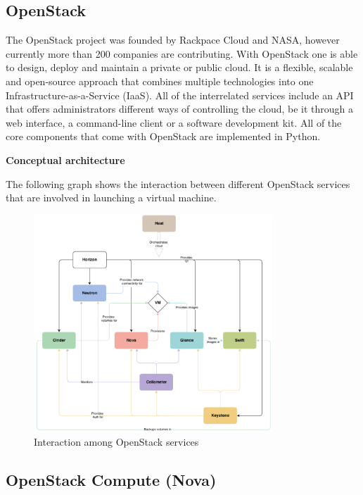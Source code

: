 \subsection{OpenStack}

The OpenStack project was founded by Rackpace Cloud and NASA, however currently more than 200 companies are contributing.
With OpenStack one is able to design, deploy and maintain a private or public cloud. It is a flexible, scalable and open-source approach that combines multiple technologies into one Infrastructure-as-a-Service (IaaS). All of the interrelated services include an API that offers administrators different ways of controlling the cloud, be it through a web interface, a command-line client or a software development kit. All of the core components that come with OpenStack are implemented in Python.


\textbf{Conceptual architecture}

The following graph shows the interaction between different OpenStack services that are involved in launching a virtual machine.

\begin{figure}[H]
\centering
\includegraphics[width=0.8\textwidth]{images/fundamentals/openstack_conceptual_arch.png}
\caption{Interaction among OpenStack services}
\end{figure}


\subsection{OpenStack Compute (Nova)}

